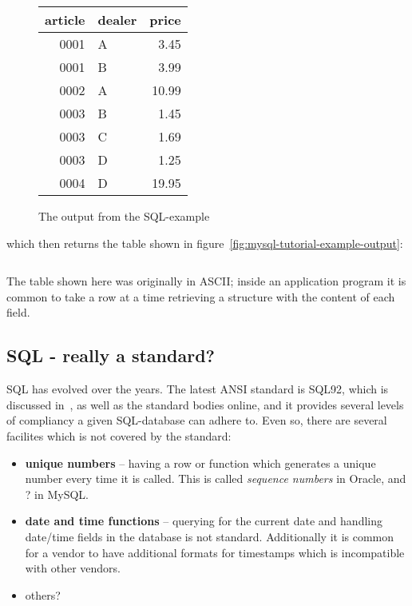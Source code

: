 \begin{figure}[htbp]
  \begin{center}
    \begin{tabular}{|r|l|r|}
\hline\hline
 article & dealer & price\\
\hline
    0001 & A      &  3.45\\
    0001 & B      &  3.99\\
    0002 & A      & 10.99\\
    0003 & B      &  1.45\\
    0003 & C      &  1.69\\
    0003 & D      &  1.25\\
    0004 & D      & 19.95\\
\hline
    \end{tabular}

    \caption{The output from the SQL-example}
    \label{fig:mysql-tutorial-example-output}
  \end{center}
\end{figure}
which then returns the table shown in figure~\vref{fig:mysql-tutorial-example-output}:

\begin{verbatim}
\end{verbatim}

The table shown here was originally in ASCII; inside an application
program it is common to take a row at a time retrieving a structure
with the content of each field.


\subsection{SQL - really a standard?}
\label{sec:how-standardized-is-sql}

SQL has evolved over the years.  The latest ANSI standard is SQL92,
which is discussed in~\cite{understanding-the-new-sql}, \textsf{as
  well as the standard bodies online}, and it provides several levels
of compliancy a given SQL-database can adhere to.  Even so, there are
several facilites which is not covered by the standard:

\begin{itemize}
\item \textbf{unique numbers} -- having a row or function which
  generates a unique number every time it is called.  This is called
  \textit{sequence numbers} in Oracle, and \textsf{?} in MySQL.
\item \textbf{date and time functions} -- querying for the current
  date and handling date/time fields in the database is not standard.
  Additionally it is common for a vendor to have additional formats
  for timestamps which is incompatible with other vendors.
\item \textsf{others?}
\end{itemize}

